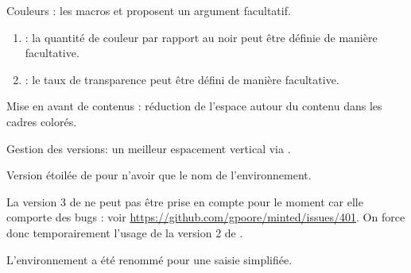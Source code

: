 \begin{tdocupdate}
    \item Couleurs : les macros  et  proposent un argument facultatif.
    \begin{enumerate}
        \item {} : la quantité de couleur par rapport au noir peut être définie de manière facultative.

        \item {} : le taux de transparence peut être défini de manière facultative.
    \end{enumerate}

    \item Mise en avant de contenus : réduction de l'espace autour du contenu dans les cadres colorés.

    \item Gestion des versions: un meilleur espacement vertical via .
\end{tdocupdate}

\tdocsep




\begin{tdocnew}[version = 1.3.1, date = 2024-09-26]
    \item Version étoilée de  pour n'avoir que le nom de l'environnement.
\end{tdocnew}

\tdocsep




\begin{tdoctech}[version = 1.3.0, date = 2024-09-25]
    \item La version 3 de  ne peut pas être prise en compte pour le moment car elle comporte des bugs : voir \url{https://github.com/gpoore/minted/issues/401}. On force donc temporairement l'usage de la version 2 de .
\end{tdoctech}


\begin{tdocbreak}
    \item L'environnement  a été renommé  pour une saisie simplifiée.
\end{tdocbreak}


